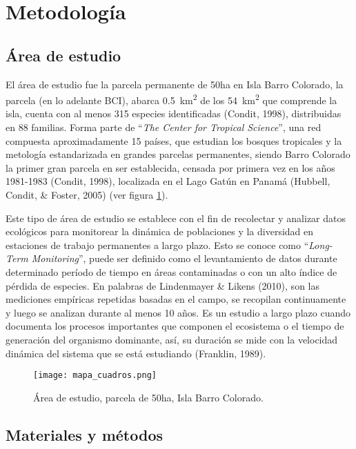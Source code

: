 \documentclass[11pt,]{article}
\begin{document}
\section{Metodología}\label{metodologuxeda}

\subsection{Área de estudio}\label{uxe1rea-de-estudio}

El área de estudio fue la parcela permanente de 50ha en Isla Barro
Colorado, la parcela (en lo adelante BCI), abarca
0.5~km\textsuperscript{2} de los 54~km\textsuperscript{2} que comprende
la isla, cuenta con al menos 315 especies identificadas (Condit, 1998),
distribuidas en 88 familias. Forma parte de ``\emph{The Center for
Tropical Science}'', una red compuesta aproximadamente 15 países, que
estudian los bosques tropicales y la metología estandarizada en grandes
parcelas permanentes, siendo Barro Colorado la primer gran parcela en
ser establecida, censada por primera vez en los años 1981-1983 (Condit,
1998), localizada en el Lago Gatún en Panamá (Hubbell, Condit, \&
Foster, 2005) (ver figura \ref{fig:mapa_cuadros}).

Este tipo de área de estudio se establece con el fin de recolectar y
analizar datos ecológicos para monitorear la dinámica de poblaciones y
la diversidad en estaciones de trabajo permanentes a largo plazo. Esto
se conoce como ``\emph{Long-Term Monitoring}'', puede ser definido como
el levantamiento de datos durante determinado período de tiempo en áreas
contaminadas o con un alto índice de pérdida de especies. En palabras de
Lindenmayer \& Likens (2010), son las mediciones empíricas repetidas
basadas en el campo, se recopilan continuamente y luego se analizan
durante al menos 10 años. Es un estudio a largo plazo cuando documenta
los procesos importantes que componen el ecosistema o el tiempo de
generación del organismo dominante, así, su duración se mide con la
velocidad dinámica del sistema que se está estudiando (Franklin, 1989).

\begin{figure}
\centering
\texttt{[image: mapa\_cuadros.png]}
\caption{Área de estudio, parcela de 50ha, Isla Barro Colorado.
\label{fig:mapa_cuadros}}
\end{figure}

\subsection{Materiales y métodos}\label{materiales-y-muxe9todos}
\end{document}
